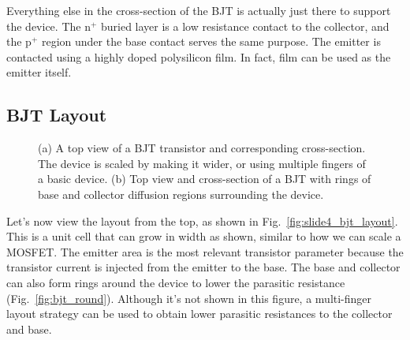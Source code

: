 Everything else in the cross-section of the BJT is actually just there to support the device.  The n$^+$ buried layer is a low resistance contact to the collector, and the p$^+$ region under the base contact serves the same purpose.  The emitter is contacted using a highly doped polysilicon film. In fact, film can be used as the emitter itself.
\subsection{BJT Layout}
\begin{figure}[tb]
\begin{center}
\hspace{1cm}
\end{center}
\caption{(a) A top view of a BJT transistor and corresponding cross-section.  The device is scaled by making it wider, or using multiple fingers of a basic device.  (b) Top view and cross-section of a BJT with rings of base and collector diffusion regions surrounding the device.} 
\end{figure}

Let's now view the layout from the top, as shown in Fig.~\ref{fig:slide4_bjt_layout}.  This is a unit cell that can grow in width as shown, similar to how we can scale a MOSFET.  The emitter area is the most relevant transistor parameter because the transistor current is injected from the emitter to the base.  The base and collector can also form rings around the device to lower the parasitic resistance (Fig.~\ref{fig:bjt_round}).  Although it's not shown in this figure, a multi-finger layout strategy can be used to obtain lower parasitic resistances to the collector and base.  
